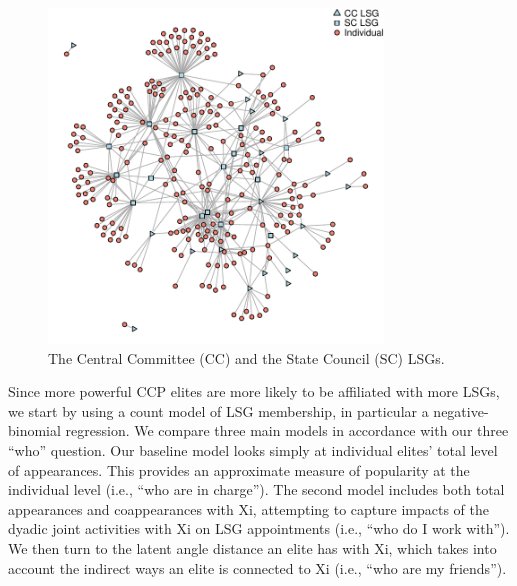 \documentclass[11pt,english]{article}
\begin{document}
\begin{flushleft}
\noindent \begin{center}
\begin{figure}[H]
\noindent \begin{centering}
\includegraphics[width=3.5in]{figure/LSG_full}
\par\end{centering}
\caption{The Central Committee (CC) and the State Council (SC) LSGs.}
\label{fig:lsgNet}
\end{figure}
\par\end{center}

Since more powerful CCP elites are more likely to be affiliated with more LSGs, we start by using a count model of LSG membership, in particular a negative-binomial regression. We compare three main models in accordance with our three ``who'' question. Our baseline model looks simply at individual elites' total level of appearances. This provides an approximate measure of popularity at the individual level (i.e., ``who are in charge''). The second model includes both total appearances and coappearances with Xi, attempting to capture impacts of the dyadic joint activities with Xi on LSG appointments (i.e., ``who do I work with''). We then turn to the latent angle distance an elite has with Xi, which takes into account the indirect ways an elite is connected to Xi (i.e., ``who are my friends'').


\end{flushleft}
\end{document}

